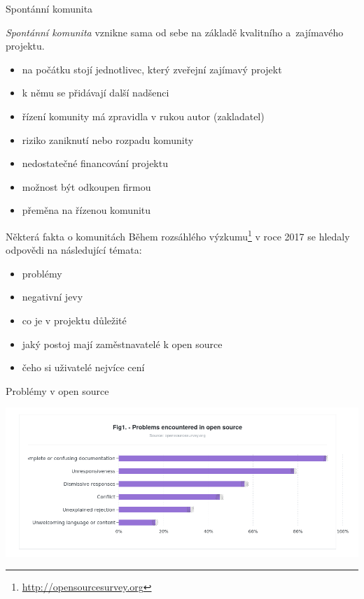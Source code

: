 \documentclass[11pt]{beamer}
\begin{document}
\begin{frame}{Spontánní komunita}
	
	\textit{Spontánní komunita} vznikne sama od sebe na základě kvalitního a~zajímavého projektu.
	
	\begin{itemize}
		\item na počátku stojí jednotlivec, který zveřejní zajímavý projekt
		\item k němu se přidávají další nadšenci
		\item řízení komunity má zpravidla v rukou autor (zakladatel)
		\item riziko zaniknutí nebo rozpadu komunity
		\item nedostatečné financování projektu
		\item možnost být odkoupen firmou
		\item přeměna na řízenou komunitu
	\end{itemize}
\end{frame}

\begin{frame}{Některá fakta o komunitách}
	Během rozsáhlého výzkumu\footnote{\url{http://opensourcesurvey.org}} v roce 2017 se hledaly odpovědi na následující témata:
	\begin{itemize}
		\item problémy
		\item negativní jevy
		\item co je v projektu důležité
		\item jaký postoj mají zaměstnavatelé k open source
		\item čeho si uživatelé nejvíce cení
	\end{itemize}
\end{frame}	

\begin{frame}{Problémy v open source}
	\begin{center}
		\includegraphics[width=\textwidth]{images/problems.png}
	\end{center}
\end{frame}
\end{document}
